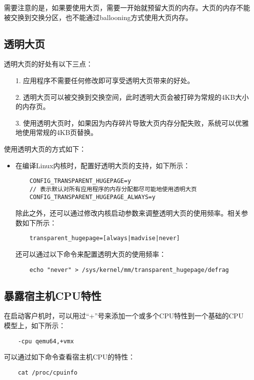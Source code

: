 \documentclass[a4paper,left=2.5cm,right=2.5cm,11pt]{article}
\begin{document}
	需要注意的是，如果要使用大页，需要一开始就预留大页的内存。大页的内存不能被交换到交换分区，也不能通过ballooning方式使用大页内存。

\subsection{透明大页}
	透明大页的好处有以下三点：
	\begin{itemize}
		\item[1.] 应用程序不需要任何修改即可享受透明大页带来的好处。
		\item[2.] 透明大页可以被交换到交换空间，此时透明大页会被打碎为常规的4KB大小的内存页。
		\item[3.] 使用透明大页时，如果因为内存碎片导致大页内存分配失败，系统可以优雅地使用常规的4KB页替换。
	\end{itemize}

	使用透明大页的方式如下：
	\begin{itemize}
		\item 在编译Linux内核时，配置好透明大页的支持，如下所示：
		\begin{lstlisting}
	CONFIG_TRANSPARENT_HUGEPAGE=y
	// 表示默认对所有应用程序的内存分配都尽可能地使用透明大页
	CONFIG_TRANSPARENT_HUGEPAGE_ALWAYS=y
		\end{lstlisting}

		除此之外，还可以通过修改内核启动参数来调整透明大页的使用频率。相关参数如下所示：
		\begin{lstlisting}
	transparent_hugepage=[always|madvise|never]
		\end{lstlisting}

		还可以通过以下命令来配置透明大页的使用频率：
		\begin{lstlisting}
	echo "never" > /sys/kernel/mm/transparent_hugepage/defrag
		\end{lstlisting}
	\end{itemize}

\subsection{暴露宿主机CPU特性}
	在启动客户机时，可以用过“+”号来添加一个或多个CPU特性到一个基础的CPU模型上，如下所示：
	\begin{lstlisting}
	-cpu qemu64,+vmx
	\end{lstlisting}

	可以通过如下命令查看宿主机CPU的特性：
	\begin{lstlisting}
	cat /proc/cpuinfo
	\end{lstlisting}
\end{document}
